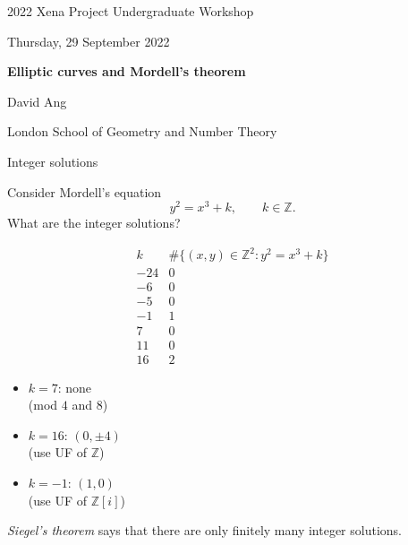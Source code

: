 \documentclass[10pt]{beamer}
\begin{document}
\begin{frame}

\begin{center}

{\small 2022 Xena Project Undergraduate Workshop}

\vspace{0.5cm}

{\footnotesize Thursday, 29 September 2022}

\vspace{1cm}

\textbf{\large Elliptic curves and Mordell's theorem}

\vspace{1cm}

David Ang

\vspace{0.5cm}

{\scriptsize London School of Geometry and Number Theory}

\end{center}

\end{frame}

\begin{frame}[t]{Integer solutions}

Consider Mordell's equation
$$ y^2 = x^3 + k, \qquad k \in \mathbb{Z}. $$
What are the integer solutions?

\begin{minipage}{0.6\textwidth}
$$
\begin{array}{c|c}
k & \#\{(x, y) \in \mathbb{Z}^2 : y^2 = x^3 + k\} \\
\hline
-24 & 0 \\
-6 & 0 \\
-5 & 0 \\
-1 & 1 \\
7 & 0 \\
11 & 0 \\
16 & 2
\end{array}
$$
\end{minipage}
\begin{minipage}{0.3\textwidth}
\vspace{1cm}
\begin{itemize}
\item $ k = 7 $: none \\ (mod $ 4 $ and $ 8 $)
\item $ k = 16 $: $ (0, \pm 4) $ \\ (use UF of $ \mathbb{Z} $)
\item $ k = -1 $: $ (1, 0) $ \\ (use UF of $ \mathbb{Z}[i] $)
\end{itemize}
\end{minipage}

\vspace{0.5cm}

\emph{Siegel's theorem} says that there are only finitely many integer solutions.

\end{frame}
\end{document}

